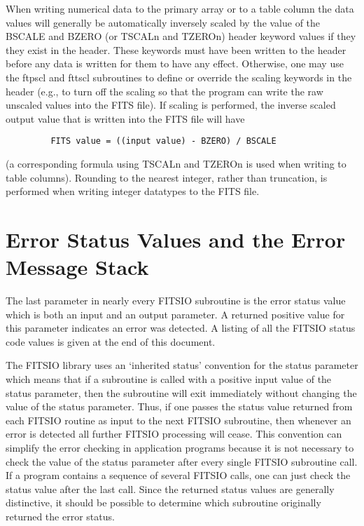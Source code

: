 \documentclass[11pt]{book}
\begin{document}
When writing numerical data to the primary array or to a table
column the data values will generally be automatically inversely scaled
by the value of the BSCALE and BZERO (or TSCALn and TZEROn) header
keyword values if they they exist in the header.  These keywords must
have been written to the header before any data is written for them to
have any effect.  Otherwise, one may use the ftpscl and fttscl
subroutines to define or override the scaling keywords in the header
(e.g., to turn off the scaling so that the program can write the raw
unscaled values into the FITS file). If scaling is performed, the
inverse scaled output value that is written into the FITS file will
have

\begin{verbatim}
         FITS value = ((input value) - BZERO) / BSCALE
\end{verbatim}
(a corresponding formula using TSCALn and TZEROn is used when
writing to table columns).  Rounding to the nearest integer, rather
than truncation, is performed when writing integer datatypes to the
FITS file.


\section{Error Status Values and the Error Message Stack}

The last parameter in nearly every FITSIO subroutine is the error
status value which is both an input and an output parameter.  A
returned positive value for this parameter indicates an error was
detected.  A listing of all the FITSIO status code values is given at
the end of this document.

The FITSIO library uses an `inherited status' convention for the status
parameter which means that if a subroutine is called with a positive
input value of the status parameter, then the subroutine will exit
immediately without changing the value of the status parameter.  Thus,
if one passes the status value returned from each FITSIO routine as
input to the next FITSIO subroutine, then whenever an error is detected
all further FITSIO processing will cease.  This convention can simplify
the error checking in application programs because it is not necessary
to check the value of the status parameter after every single FITSIO
subroutine call.  If a program contains a sequence of several FITSIO
calls, one can just check the status value after the last call.  Since
the returned status values are generally distinctive, it should be
possible to determine which subroutine originally returned the error
status.
\end{document}
